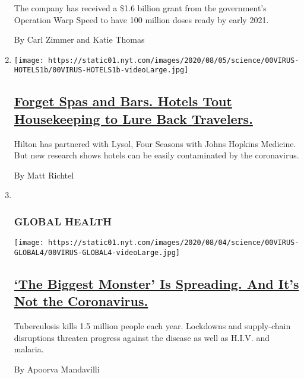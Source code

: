 \begin{enumerate}
  The company has received a \$1.6 billion grant from the government's
  Operation Warp Speed to have 100 million doses ready by early 2021.

  By Carl Zimmer and Katie Thomas
\item
  \texttt{[image: https://static01.nyt.com/images/2020/08/05/science/00VIRUS-HOTELS1b/00VIRUS-HOTELS1b-videoLarge.jpg]}

  \hypertarget{forget-spas-and-bars-hotels-tout-housekeeping-to-lure-back-travelers}{%
  \subsection{\texorpdfstring{\href{/2020/08/04/health/coronavirus-hotels-infect.html}{Forget
  Spas and Bars. Hotels Tout Housekeeping to Lure Back
  Travelers.}}{Forget Spas and Bars. Hotels Tout Housekeeping to Lure Back Travelers.}}\label{forget-spas-and-bars-hotels-tout-housekeeping-to-lure-back-travelers}}

  Hilton has partnered with Lysol, Four Seasons with Johns Hopkins
  Medicine. But new research shows hotels can be easily contaminated by
  the coronavirus.

  By Matt Richtel
\item ~
  \hypertarget{global-health}{%
  \subsubsection{GLOBAL HEALTH}\label{global-health}}

  \texttt{[image: https://static01.nyt.com/images/2020/08/04/science/00VIRUS-GLOBAL4/00VIRUS-GLOBAL4-videoLarge.jpg]}

  \hypertarget{the-biggest-monster-is-spreading-and-its-not-the-coronavirus}{%
  \subsection{\texorpdfstring{\href{/2020/08/03/health/coronavirus-tuberculosis-aids-malaria.html}{`The
  Biggest Monster' Is Spreading. And It's Not the
  Coronavirus.}}{`The Biggest Monster' Is Spreading. And It's Not the Coronavirus.}}\label{the-biggest-monster-is-spreading-and-its-not-the-coronavirus}}

  Tuberculosis kills 1.5 million people each year. Lockdowns and
  supply-chain disruptions threaten progress against the disease as well
  as H.I.V. and malaria.

  By Apoorva Mandavilli
\end{enumerate}

